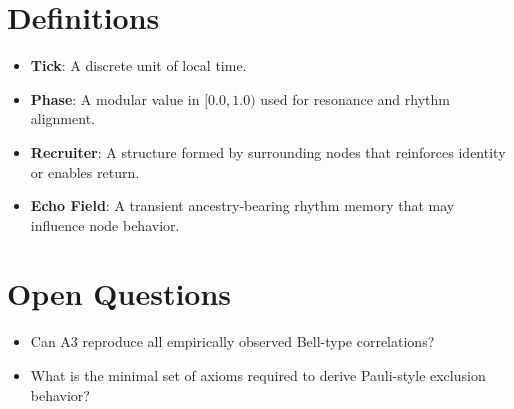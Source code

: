 \documentclass[12pt]{article}
\begin{document}
\section{Definitions}

\begin{itemize}
    \item \textbf{Tick}: A discrete unit of local time.
    \item \textbf{Phase}: A modular value in $[0.0, 1.0)$ used for resonance and rhythm alignment.
    \item \textbf{Recruiter}: A structure formed by surrounding nodes that reinforces identity or enables return.
    \item \textbf{Echo Field}: A transient ancestry-bearing rhythm memory that may influence node behavior.
\end{itemize}

\section{Open Questions}

\begin{itemize}
    \item Can A3 reproduce all empirically observed Bell-type correlations?
    \item What is the minimal set of axioms required to derive Pauli-style exclusion behavior?
\end{itemize}
\end{document}
